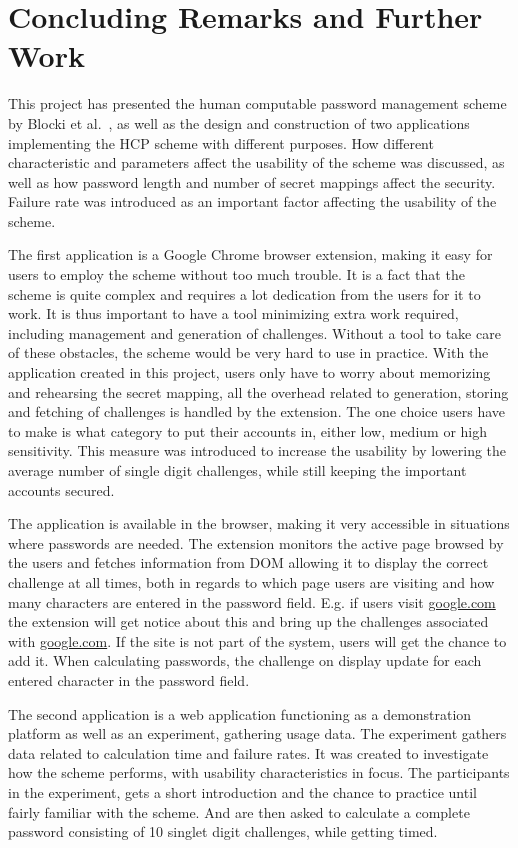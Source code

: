 \chapter{Concluding Remarks and Further Work}
This project has presented the human computable password management scheme by Blocki et al.~\cite{hcp-blocki}, as well as the design and construction of two applications implementing the HCP scheme with different purposes. How different characteristic and parameters affect the usability of the scheme was discussed, as well as how password length and number of secret mappings affect the security. Failure rate was introduced as an important factor affecting the usability of the scheme. 
\par The first application is a Google Chrome browser extension, making it easy for users to employ the scheme without too much trouble. It is a fact that the scheme is quite complex and requires a lot dedication from the users for it to work. It is thus important to have a tool minimizing extra work required, including management and generation of challenges. Without a tool to take care of these obstacles, the scheme would be very hard to use in practice. With the application created in this project, users only have to worry about memorizing and rehearsing the secret mapping, all the overhead related to generation, storing and fetching of challenges is handled by the extension. The one choice users have to make is what category to put their accounts in, either low, medium or high sensitivity. This measure was introduced to increase the usability by lowering the average number of single digit challenges, while still keeping the important accounts secured.
\par The application is available in the browser, making it very accessible in situations where passwords are needed. The extension monitors the active page browsed by the users and fetches information from DOM allowing it to display the correct challenge at all times, both in regards to which page users are visiting and how many characters are entered in the password field. E.g. if users visit \url{google.com} the extension will get notice about this and bring up the challenges associated with \url{google.com}. If the site is not part of the system, users will get the chance to add it. When calculating passwords, the challenge on display update for each entered character in the password field.
\par The second application is a web application functioning as a demonstration platform as well as an experiment, gathering usage data. The experiment gathers data related to calculation time and failure rates. It was created to investigate how the scheme performs, with usability characteristics in focus. The participants in the experiment, gets a short introduction and the chance to practice until fairly familiar with the scheme. And are then asked to calculate a complete password consisting of 10 singlet digit challenges, while getting timed.
